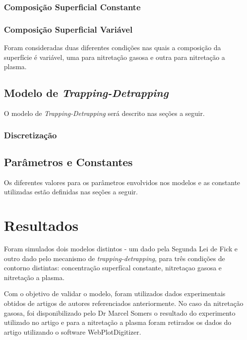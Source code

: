 \documentclass[]{politex}
\begin{document}
\subsection{Composição Superficial Constante}
\label{sec:sol-numerica-2alei}


\subsection{Composição Superficial Variável}
Foram consideradas duas diferentes condições nas quais a composição da superfície é variável, uma para nitretação gasosa e outra para nitretação a plasma.
\label{sec:sol-numerica-2alei2}




\section{Modelo de \textit{Trapping-Detrapping}}
O modelo de \textit{Trapping-Detrapping} será descrito nas seções a seguir. 
\label{sec:my-trapdetrap}


\subsection{Discretização}



\section{Parâmetros e Constantes}
Os diferentes valores para os parâmetros envolvidos nos modelos e as constante utilizadas estão definidas nas seções a seguir.
\label{sec:params}




\chapter{Resultados}
	Foram simulados dois modelos distintos - um dado pela Segunda Lei de Fick e outro dado pelo mecanismo de \textit{trapping-detrapping}, para três condições de contorno distintas: concentração superfícal constante, nitretaçao gasosa e nitretação a plasma.
	
	Com o objetivo de validar o modelo, foram utilizados dados experimentais obtidos de artigos de autores referenciados anteriormente. No caso da nitretação gasosa, foi disponibilizado pelo Dr Marcel Somers o resultado do experimento utilizado no artigo \cite{christiansen2008nitrogen} e para a nitretação a plasma foram retirados os dados do artigo \cite{moskalioviene2011modeling} utilizando o software WebPlotDigitizer.
	
\end{document}

